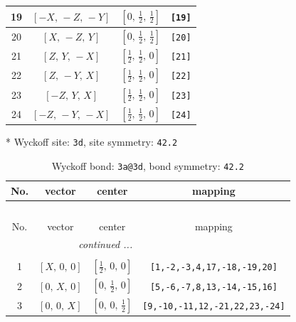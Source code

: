 \documentclass[fleqn,8pt]{jsarticle}
\begin{document}
\begin{longtable}{cccc}
19 & $\left[ - X,\, - Z,\, - Y \right]$ & $\left[ 0,\, \frac{1}{2},\, \frac{1}{2} \right]$ & {\tt [19]} \\ \hline
20 & $\left[ X,\, - Z,\, Y \right]$ & $\left[ 0,\, \frac{1}{2},\, \frac{1}{2} \right]$ & {\tt [20]} \\ \hline
21 & $\left[ Z,\, Y,\, - X \right]$ & $\left[ \frac{1}{2},\, \frac{1}{2},\, 0 \right]$ & {\tt [21]} \\ \hline
22 & $\left[ Z,\, - Y,\, X \right]$ & $\left[ \frac{1}{2},\, \frac{1}{2},\, 0 \right]$ & {\tt [22]} \\ \hline
23 & $\left[ - Z,\, Y,\, X \right]$ & $\left[ \frac{1}{2},\, \frac{1}{2},\, 0 \right]$ & {\tt [23]} \\ \hline
24 & $\left[ - Z,\, - Y,\, - X \right]$ & $\left[ \frac{1}{2},\, \frac{1}{2},\, 0 \right]$ & {\tt [24]} \\
\end{longtable}
* Wyckoff site: {\tt 3d}, site symmetry: {\tt 42.2}
\renewcommand{\arraystretch}{1.2}
\begin{longtable}{cccc}
\caption{Wyckoff bond: {\tt 3a@3d}, bond symmetry: {\tt 42.2}}
 \\
 \hline \hline
No. & vector & center & mapping \\ \hline \endfirsthead

\multicolumn{3}{l}{\tablename\ \thetable{}} \\
 \hline \hline
No. & vector & center & mapping \\ \hline \endhead

 \hline \hline
\multicolumn{3}{r}{\footnotesize\it continued ...} \\ \endfoot

 \hline \hline
\multicolumn{3}{r}{} \\ \endlastfoot

1 & $\left[ X,\, 0,\, 0 \right]$ & $\left[ \frac{1}{2},\, 0,\, 0 \right]$ & {\tt [1,-2,-3,4,17,-18,-19,20]} \\ \hline
2 & $\left[ 0,\, X,\, 0 \right]$ & $\left[ 0,\, \frac{1}{2},\, 0 \right]$ & {\tt [5,-6,-7,8,13,-14,-15,16]} \\ \hline
3 & $\left[ 0,\, 0,\, X \right]$ & $\left[ 0,\, 0,\, \frac{1}{2} \right]$ & {\tt [9,-10,-11,12,-21,22,23,-24]} \\
\end{longtable}
\renewcommand{\arraystretch}{1.2}
\end{document}
